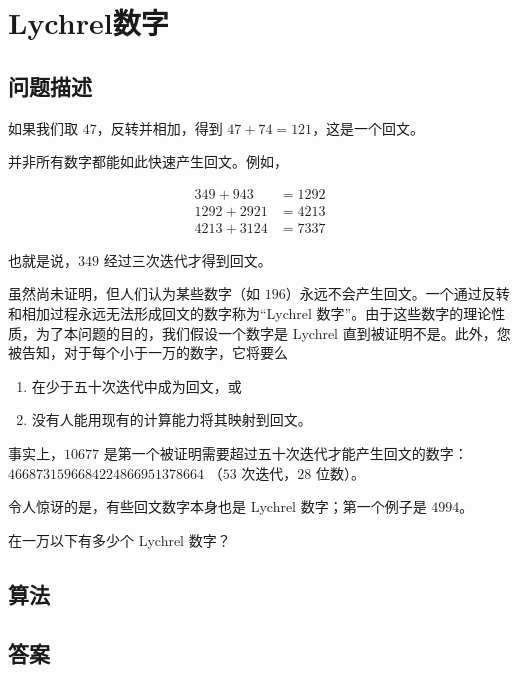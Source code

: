\section{Lychrel数字}
\subsection{问题描述}
\begin{tcolorbox}
	如果我们取 $47$，反转并相加，得到 $47 + 74 = 121$，这是一个回文。

	并非所有数字都能如此快速产生回文。例如，

	\begin{align}
		349 + 943   & = 1292 \\
		1292 + 2921 & = 4213 \\
		4213 + 3124 & = 7337
	\end{align}

	也就是说，$349$ 经过三次迭代才得到回文。

	虽然尚未证明，但人们认为某些数字（如 $196$）永远不会产生回文。一个通过反转和相加过程永远无法形成回文的数字称为“Lychrel 数字”。由于这些数字的理论性质，为了本问题的目的，我们假设一个数字是 Lychrel 直到被证明不是。此外，您被告知，对于每个小于一万的数字，它将要么
	\begin{enumerate}[label={(\roman*)}]
		\item 在少于五十次迭代中成为回文，或
		\item 没有人能用现有的计算能力将其映射到回文。
	\end{enumerate}
	事实上，$10677$ 是第一个被证明需要超过五十次迭代才能产生回文的数字：$4668731596684224866951378664$ （$53$ 次迭代，$28$ 位数）。

	令人惊讶的是，有些回文数字本身也是 Lychrel 数字；第一个例子是 $4994$。

	在一万以下有多少个 Lychrel 数字？
\end{tcolorbox}

\subsection{算法}

\subsection{答案}
